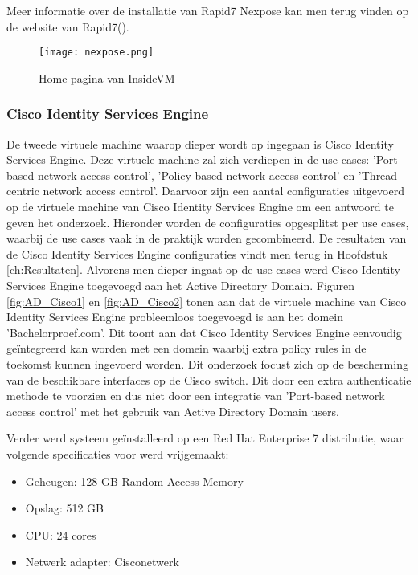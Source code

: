 Meer informatie over de installatie van Rapid7 Nexpose kan men terug vinden op de website van Rapid7(\cite{rapid7}).

\begin{figure}[H]
	\centering
	\texttt{[image: nexpose.png]}
	\caption{Home pagina van InsideVM}%
	\label{fig:nexpose}%
\end{figure}

\subsubsection{Cisco Identity Services Engine}
De tweede virtuele machine waarop dieper wordt op ingegaan is Cisco Identity Services Engine. Deze virtuele machine zal zich verdiepen in de use cases: 'Port-based network access control', 'Policy-based network access control' en 'Thread-centric network access control'. Daarvoor zijn een aantal configuraties uitgevoerd op de virtuele machine van Cisco Identity Services Engine om een antwoord te geven het onderzoek. Hieronder worden de configuraties opgesplitst per use cases, waarbij de use cases vaak in de praktijk worden gecombineerd. De resultaten van de Cisco Identity Services Engine configuraties vindt men terug in Hoofdstuk \ref{ch:Resultaten}.
\newline
\newline
Alvorens men dieper ingaat op de use cases werd Cisco Identity Services Engine toegevoegd aan het Active Directory Domain. Figuren \ref{fig:AD_Cisco1} en \ref{fig:AD_Cisco2} tonen aan dat de virtuele machine van Cisco Identity Services Engine probleemloos toegevoegd is aan het domein 'Bachelorproef.com'. Dit toont aan dat Cisco Identity Services Engine eenvoudig geïntegreerd kan worden met een domein waarbij extra policy rules  in de toekomst kunnen ingevoerd worden. Dit onderzoek focust zich op de bescherming van de beschikbare interfaces op de Cisco switch. Dit door een extra authenticatie methode te voorzien en dus niet door een integratie van 'Port-based network access control' met het gebruik van Active Directory Domain users.

Verder werd systeem geïnstalleerd op een Red Hat Enterprise 7 distributie, waar volgende specificaties voor werd vrijgemaakt: 

\begin{itemize}
	\item Geheugen: 128 GB Random Access Memory
	\item Opslag: 512 GB
	\item CPU: 24 cores
	\item Netwerk adapter: Cisco\textunderscore netwerk
\end{itemize}

